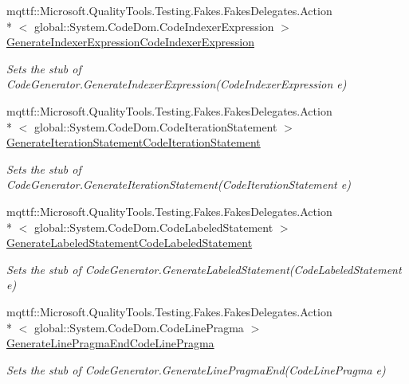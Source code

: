 \begin{DoxyCompactItemize}
mqttf\-::\-Microsoft.\-Quality\-Tools.\-Testing.\-Fakes.\-Fakes\-Delegates.\-Action\\*
$<$ global\-::\-System.\-Code\-Dom.\-Code\-Indexer\-Expression $>$ \hyperlink{class_system_1_1_code_dom_1_1_compiler_1_1_fakes_1_1_stub_code_compiler_a229dfdccddb7932ef3bccc594d5e10c5}{Generate\-Indexer\-Expression\-Code\-Indexer\-Expression}
\begin{DoxyCompactList}\small\item\em Sets the stub of Code\-Generator.\-Generate\-Indexer\-Expression(\-Code\-Indexer\-Expression e)\end{DoxyCompactList}\item 
mqttf\-::\-Microsoft.\-Quality\-Tools.\-Testing.\-Fakes.\-Fakes\-Delegates.\-Action\\*
$<$ global\-::\-System.\-Code\-Dom.\-Code\-Iteration\-Statement $>$ \hyperlink{class_system_1_1_code_dom_1_1_compiler_1_1_fakes_1_1_stub_code_compiler_a6367e7033e1ad0457399221ecbcfe746}{Generate\-Iteration\-Statement\-Code\-Iteration\-Statement}
\begin{DoxyCompactList}\small\item\em Sets the stub of Code\-Generator.\-Generate\-Iteration\-Statement(\-Code\-Iteration\-Statement e)\end{DoxyCompactList}\item 
mqttf\-::\-Microsoft.\-Quality\-Tools.\-Testing.\-Fakes.\-Fakes\-Delegates.\-Action\\*
$<$ global\-::\-System.\-Code\-Dom.\-Code\-Labeled\-Statement $>$ \hyperlink{class_system_1_1_code_dom_1_1_compiler_1_1_fakes_1_1_stub_code_compiler_a7a80d177ee350f994ff756719b694c9f}{Generate\-Labeled\-Statement\-Code\-Labeled\-Statement}
\begin{DoxyCompactList}\small\item\em Sets the stub of Code\-Generator.\-Generate\-Labeled\-Statement(\-Code\-Labeled\-Statement e)\end{DoxyCompactList}\item 
mqttf\-::\-Microsoft.\-Quality\-Tools.\-Testing.\-Fakes.\-Fakes\-Delegates.\-Action\\*
$<$ global\-::\-System.\-Code\-Dom.\-Code\-Line\-Pragma $>$ \hyperlink{class_system_1_1_code_dom_1_1_compiler_1_1_fakes_1_1_stub_code_compiler_a9ee01e00f8b1e3655c7c87abdbeb3416}{Generate\-Line\-Pragma\-End\-Code\-Line\-Pragma}
\begin{DoxyCompactList}\small\item\em Sets the stub of Code\-Generator.\-Generate\-Line\-Pragma\-End(\-Code\-Line\-Pragma e)\end{DoxyCompactList}\item 

\end{DoxyCompactItemize}

